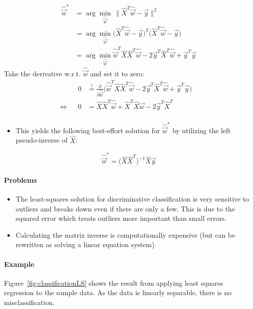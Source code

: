 			\begin{align} %
				\hat{\vec{w}}^\ast &= \arg\min\limits_{\hat{\vec{w}}} \, \lVert \hat{X}^T \hat{\vec{w}} - \vec{y} \rVert^2 \\
								   &= \arg\min\limits_{\hat{\vec{w}}} \big( \hat{X}^T \hat{\vec{w}} - \vec{y} \big)^T \big( \hat{X}^T \hat{\vec{w}} - \vec{y} \big) \\
								   &= \arg\min\limits_{\hat{\vec{w}}} \hat{\vec{w}}^T \hat{X} \hat{X}^T \hat{\vec{w}} - 2\vec{y}^T\hat{X}^T\hat{\vec{w}} + \vec{y}^T\vec{y}
			\end{align}
			Take the derivative w.r.t. \( \hat{\vec{w}} \) and set it to zero:
			\begin{align}
				&& 0 &\overset{!}{=} \frac{\partial}{\partial \hat{\vec{w}}} \big( \hat{\vec{w}}^T \hat{X} \hat{X}^T \hat{\vec{w}} - 2\vec{y}^T\hat{X}^T\hat{\vec{w}} + \vec{y}^T\vec{y} \big) & \\
				\iff && 0 &= \hat{X} \hat{X}^T \hat{\vec{w}} + \hat{X}^T \hat{X} \hat{\vec{w}} - 2\vec{y}^T\hat{X}^T & \\
			\end{align}
			\begin{itemize}
				\item This yields the following best-effort solution for \( \hat{\vec{w}}^\ast \) by utilizing the left pseudo-inverse of \(\hat{X}\):
			\end{itemize}
			\begin{equation}
				\hat{\vec{w}}^\ast = \big( \hat{X} \hat{X}^T \big)^{-1} \hat{X} \vec{y}
			\end{equation}

			\paragraph{Problems}
				\begin{itemize}
					\item The least-squares solution for discriminative classification is very sensitive to outliers and breaks down even if there are only a few. This is due to the squared error which treats outliers more important than small errors.
					\item Calculating the matrix inverse is computationally expensive (but can be rewritten as solving a linear equation system).
				\end{itemize}
			
			\paragraph{Example}
				Figure~\ref{fig:classificationLS} shows the result from applying least squares regression to the sample data. As the data is linearly separable, there is no misclassification.
				
